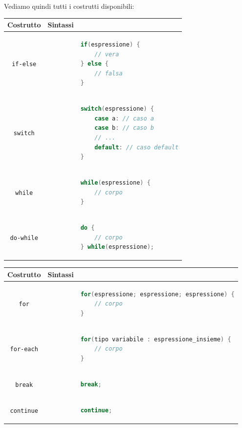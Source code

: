 \documentclass[a4paper,11pt]{article}
\begin{document}
Vediamo quindi tutti i costrutti disponibili:

\noindent
\begin{minipage}[t]{0.45\textwidth}
\begin{table}[H]
	\center 
	\begin{tabular} { c | p{.1cm} p{5cm} }
		\bfseries Costrutto & \bfseries Sintassi \\ 
		\hline 
\lstinline|if-else| & & \begin{lstlisting}[language=java, style=codestyle]	
if(espressione) {
	// vera
} else {
	// falsa
}
\end{lstlisting} \\
\lstinline|switch| & & \begin{lstlisting}[language=java, style=codestyle]	
switch(espressione) {
	case a: // caso a
	case b: // caso b
	// ...
	default: // caso default
}
\end{lstlisting} \\
\lstinline|while| & & \begin{lstlisting}[language=java, style=codestyle]	
while(espressione) {
	// corpo
}
\end{lstlisting} \\
\lstinline|do-while| & & \begin{lstlisting}[language=java, style=codestyle]	
do {
	// corpo
} while(espressione);
\end{lstlisting} \\
	\end{tabular}
\end{table}
\end{minipage}%
\hfill
\begin{minipage}[t]{0.45\textwidth}
\begin{table}[H]
	\center 
	\begin{tabular} { c | p{.1cm} p{5cm} }
		\bfseries Costrutto & \bfseries Sintassi \\ 
		\hline 
\lstinline|for| & & \begin{lstlisting}[language=java, style=codestyle]	
for(espressione; espressione; espressione) {
	// corpo
}
\end{lstlisting} \\
\lstinline|for-each| & & \begin{lstlisting}[language=java, style=codestyle]	
for(tipo variabile : espressione_insieme) {
	// corpo
}
\end{lstlisting} \\
\lstinline|break| & & \begin{lstlisting}[language=java, style=codestyle]	
break;
\end{lstlisting} \\
\lstinline|continue| & & \begin{lstlisting}[language=java, style=codestyle]	
continue;
\end{lstlisting} \\
	\end{tabular}
\end{table}
\end{minipage}
\end{document}
